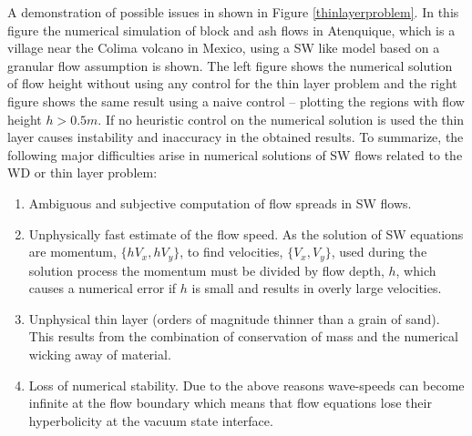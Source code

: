 \documentclass[letterpaper,10pt]{article}
\begin{document}
A demonstration of possible issues in shown in Figure \ref{thinlayerproblem}.
In this figure the numerical simulation of block and ash flows in Atenquique, which is a village near the Colima volcano in Mexico, using a SW like model 
based on a granular flow assumption is shown. The left figure shows the numerical solution of flow height without using any control for the thin layer problem 
and the right figure shows the same result  
using a naive control -- plotting the regions with flow height $h>0.5m$. If no heuristic control on the numerical solution is used the thin layer causes instability and 
inaccuracy in the obtained results.
To summarize, the following major difficulties arise in numerical solutions of SW flows related to the WD or thin layer problem:
\begin{enumerate}
        \item Ambiguous and subjective computation of flow spreads in SW flows.
        \item \label{problemwicking}
             Unphysically fast estimate of the flow speed. As the solution of SW equations are momentum, $\{hV_x,hV_y\}$, to find velocities, $\{V_x,V_y\}$, used during the solution process the
             momentum must be divided by flow depth, $h$, which causes a numerical error if $h$ is small and results in overly large velocities.
        \item \label{problemtoothin}
              Unphysical thin layer (orders of magnitude thinner than a grain of sand). This results from the combination of conservation of mass and the numerical wicking away of material.
        \item \label{problemunstable}
              Loss of numerical stability. Due to the above reasons wave-speeds can become infinite at the flow boundary which means that flow equations lose their hyperbolicity  
              at the vacuum state interface.
\end{enumerate}\label{thinprob}
\end{document}
